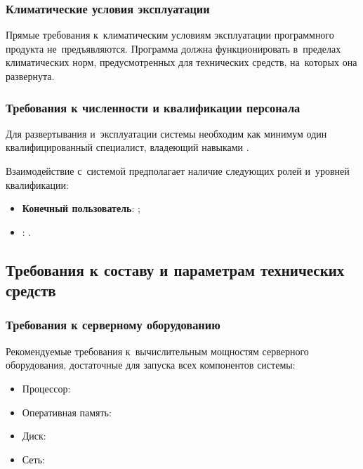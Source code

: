 \documentclass[12pt,a4paper]{extarticle}
\begin{document}
\subsubsection{Климатические условия эксплуатации}

Прямые требования к~климатическим условиям эксплуатации программного продукта не~предъявляются. Программа должна функционировать в~пределах климатических норм, предусмотренных для технических средств, на~которых она развернута.

\subsubsection{Требования к численности и квалификации персонала}

Для развертывания и~эксплуатации системы необходим как минимум один квалифицированный специалист, владеющий навыками .

Взаимодействие с~системой предполагает наличие следующих ролей и~уровней квалификации:
\begin{itemize}[nosep, leftmargin=1.25cm]
    \item \textbf{Конечный пользователь}: ;
    \item \textbf{}: .
\end{itemize}

\subsection{Требования к составу и параметрам технических средств}

\subsubsection{Требования к серверному оборудованию}
\label{sec:server_hardware}

Рекомендуемые требования к~вычислительным мощностям серверного оборудования, достаточные для запуска всех компонентов системы:

\begin{itemize}[leftmargin=1.25cm]
\item Процессор: 
\item Оперативная память: 
\item Диск: 
\item Сеть: 
\end{itemize}
\end{document}
